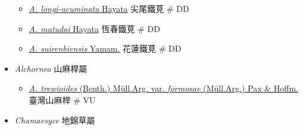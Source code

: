 \begin{itemize}
\begin{itemize}
        \item[] \href{http://www.theplantlist.org/tpl1.1/search?q=Acalypha+longi-acuminata}{\textit{A. longi-acuminata} Hayata}   尖尾鐵莧  \# DD
        \item[] \href{http://www.theplantlist.org/tpl1.1/search?q=Acalypha+matudai}{\textit{A. matudai} Hayata}   恆春鐵莧  \# DD
        \item[] \href{http://www.theplantlist.org/tpl1.1/search?q=Acalypha+suirenbiensis}{\textit{A. suirenbiensis} Yamam.}   花蓮鐵莧  \# DD
  \end{itemize}
 \item[] \textit{Alchornea} 山麻桿屬
                                
  \begin{itemize}
        \item[] \href{http://www.theplantlist.org/tpl1.1/search?q=Alchornea+trewioides+var.+formosae}{\textit{A. trewioides} (Benth.) Müll.Arg. var. \textit{formosae} (Müll.Arg.) Pax \& Hoffm.}   臺灣山麻桿  \# VU
  \end{itemize}
 \item[] \textit{Chamaesyce} 地錦草屬
                                

\end{itemize}
